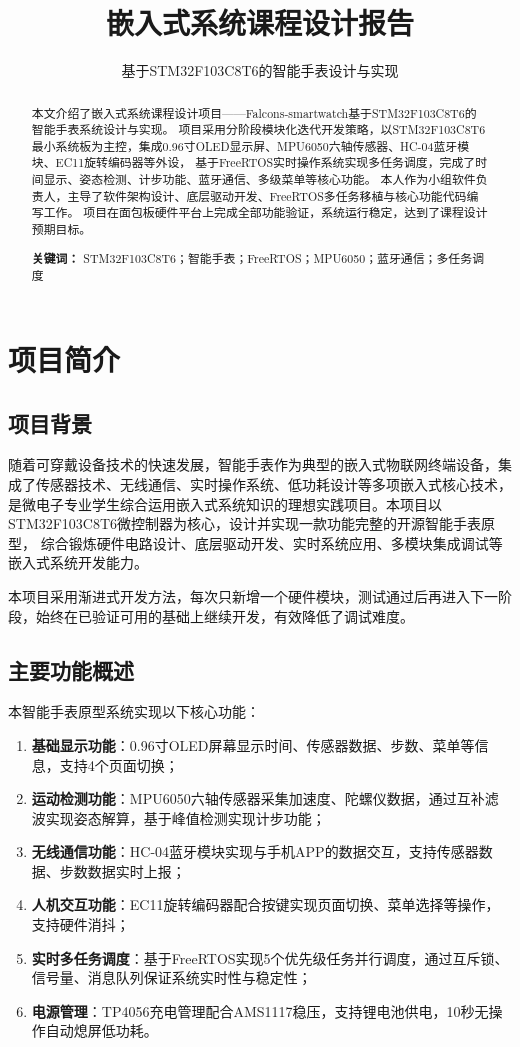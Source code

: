 \documentclass[12pt, a4paper]{ctexart}
\title{嵌入式系统课程设计报告}
\subtitle{基于STM32F103C8T6的智能手表设计与实现}
\begin{document}
\makecover

\newpage
\begin{abstract}
本文介绍了嵌入式系统课程设计项目——Falcons-smartwatch基于STM32F103C8T6的智能手表系统设计与实现。
项目采用分阶段模块化迭代开发策略，以STM32F103C8T6最小系统板为主控，集成0.96寸OLED显示屏、MPU6050六轴传感器、HC-04蓝牙模块、EC11旋转编码器等外设，
基于FreeRTOS实时操作系统实现多任务调度，完成了时间显示、姿态检测、计步功能、蓝牙通信、多级菜单等核心功能。
本人作为小组软件负责人，主导了软件架构设计、底层驱动开发、FreeRTOS多任务移植与核心功能代码编写工作。
项目在面包板硬件平台上完成全部功能验证，系统运行稳定，达到了课程设计预期目标。
\par
\textbf{关键词：} STM32F103C8T6；智能手表；FreeRTOS；MPU6050；蓝牙通信；多任务调度
\end{abstract}
\clearpage

\tableofcontents
\clearpage

\setcounter{page}{1}

\section{项目简介}
\subsection{项目背景}
随着可穿戴设备技术的快速发展，智能手表作为典型的嵌入式物联网终端设备，集成了传感器技术、无线通信、实时操作系统、低功耗设计等多项嵌入式核心技术，
是微电子专业学生综合运用嵌入式系统知识的理想实践项目。本项目以STM32F103C8T6微控制器为核心，设计并实现一款功能完整的开源智能手表原型，
综合锻炼硬件电路设计、底层驱动开发、实时系统应用、多模块集成调试等嵌入式系统开发能力。

本项目采用渐进式开发方法，每次只新增一个硬件模块，测试通过后再进入下一阶段，始终在已验证可用的基础上继续开发，有效降低了调试难度。

\subsection{主要功能概述}
本智能手表原型系统实现以下核心功能：
\begin{enumerate}
    \item \textbf{基础显示功能}：0.96寸OLED屏幕显示时间、传感器数据、步数、菜单等信息，支持4个页面切换；
    \item \textbf{运动检测功能}：MPU6050六轴传感器采集加速度、陀螺仪数据，通过互补滤波实现姿态解算，基于峰值检测实现计步功能；
    \item \textbf{无线通信功能}：HC-04蓝牙模块实现与手机APP的数据交互，支持传感器数据、步数数据实时上报；
    \item \textbf{人机交互功能}：EC11旋转编码器配合按键实现页面切换、菜单选择等操作，支持硬件消抖；
    \item \textbf{实时多任务调度}：基于FreeRTOS实现5个优先级任务并行调度，通过互斥锁、信号量、消息队列保证系统实时性与稳定性；
    \item \textbf{电源管理}：TP4056充电管理配合AMS1117稳压，支持锂电池供电，10秒无操作自动熄屏低功耗。
\end{enumerate}
\end{document}
